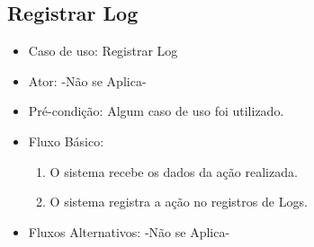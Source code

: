 \documentclass{utfpr-pg}
\begin{document}
    \subsection{Registrar Log} \label{registrarlog}
        \begin{itemize}
        \item Caso de uso: Registrar Log
        \item Ator: -Não se Aplica-
        \item Pré-condição: Algum caso de uso foi utilizado.
        \item Fluxo Básico:
             \begin{enumerate}[label=\textbf{A0.\arabic*}]
                \item \label{a01} O sistema recebe os dados da ação realizada.
                \item O sistema registra a ação no registros de Logs.
            \end{enumerate}
        \item Fluxos Alternativos: -Não se Aplica-
        
        \end{itemize}
    
\end{document}
